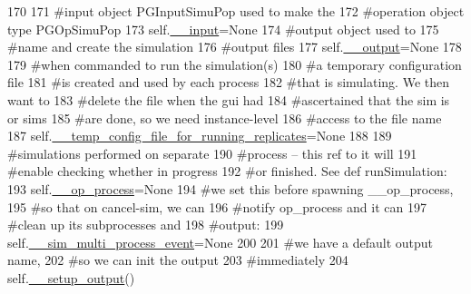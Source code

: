 \begin{DoxyCode}
170 
171         \textcolor{comment}{#input object PGInputSimuPop used to make the}
172         \textcolor{comment}{#operation object type PGOpSimuPop}
173         self.\hyperlink{classnegui_1_1pgguisimupop__experimental2_1_1PGGuiSimuPop_a69deac7dfed31f2ba496671465ee4d1c}{\_\_input}=\textcolor{keywordtype}{None}
174         \textcolor{comment}{#output object used to}
175         \textcolor{comment}{#name and create the simulation}
176         \textcolor{comment}{#output files}
177         self.\hyperlink{classnegui_1_1pgguisimupop__experimental2_1_1PGGuiSimuPop_a4868b7a9ed48d08efc2c0916bdb19ba0}{\_\_output}=\textcolor{keywordtype}{None}
178 
179         \textcolor{comment}{#when commanded to run the simulation(s)}
180         \textcolor{comment}{#a temporary configuration file}
181         \textcolor{comment}{#is created and used by each process}
182         \textcolor{comment}{#that is simulating.  We then want to}
183         \textcolor{comment}{#delete the file when the gui had }
184         \textcolor{comment}{#ascertained that the sim is or sims}
185         \textcolor{comment}{#are done, so we need instance-level}
186         \textcolor{comment}{#access to the file name}
187         self.\hyperlink{classnegui_1_1pgguisimupop__experimental2_1_1PGGuiSimuPop_a5763f8f9ded44d9616b6ac0c997dfe8d}{\_\_temp\_config\_file\_for\_running\_replicates}=\textcolor{keywordtype}{None}
188 
189         \textcolor{comment}{#simulations performed on separate}
190         \textcolor{comment}{#process -- this ref to it will}
191         \textcolor{comment}{#enable checking whether in progress}
192         \textcolor{comment}{#or finished.  See def runSimulation:}
193         self.\hyperlink{classnegui_1_1pgguisimupop__experimental2_1_1PGGuiSimuPop_acb9d611cfa9a2f1d8735f83be98808bb}{\_\_op\_process}=\textcolor{keywordtype}{None}
194         \textcolor{comment}{#we set this before spawning \_\_op\_process,}
195         \textcolor{comment}{#so that on cancel-sim, we can}
196         \textcolor{comment}{#notify op\_process and it can }
197         \textcolor{comment}{#clean up its subprocesses and }
198         \textcolor{comment}{#output:}
199         self.\hyperlink{classnegui_1_1pgguisimupop__experimental2_1_1PGGuiSimuPop_ae6ed3d2118a10faac3f6f9eb904a1826}{\_\_sim\_multi\_process\_event}=\textcolor{keywordtype}{None}
200 
201         \textcolor{comment}{#we have a default output name,}
202         \textcolor{comment}{#so we can init the output}
203         \textcolor{comment}{#immediately}
204         self.\hyperlink{classnegui_1_1pgguisimupop__experimental2_1_1PGGuiSimuPop_afc98c32f1dd3fae0b999f6831e2e2618}{\_\_setup\_output}()

\end{DoxyCode}
